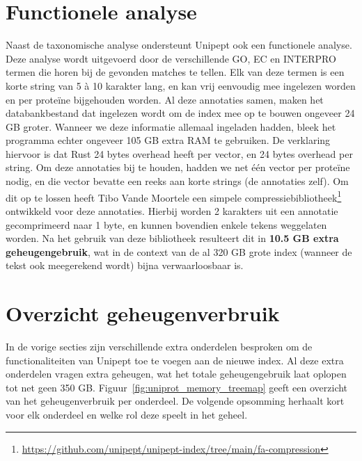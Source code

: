 \section{Functionele analyse}\label{sec:functionele-analyse}
Naast de taxonomische analyse ondersteunt Unipept ook een functionele analyse.
Deze analyse wordt uitgevoerd door de verschillende GO, EC en INTERPRO termen die horen bij de gevonden matches te tellen.
Elk van deze termen is een korte string van 5 à 10 karakter lang, en kan vrij eenvoudig mee ingelezen worden en per proteïne bijgehouden worden.
Al deze annotaties samen, maken het databankbestand dat ingelezen wordt om de index mee op te bouwen ongeveer 24 GB groter.
Wanneer we deze informatie allemaal ingeladen hadden, bleek het programma echter ongeveer 105 GB extra RAM te gebruiken.
De verklaring hiervoor is dat Rust 24 bytes overhead heeft per vector, en 24 bytes overhead per string.
Om deze annotaties bij te houden, hadden we net één vector per proteïne nodig, en die vector bevatte een reeks aan korte strings (de annotaties zelf).
Om dit op te lossen heeft Tibo Vande Moortele een simpele compressiebibliotheek\footnote{\url{https://github.com/unipept/unipept-index/tree/main/fa-compression}} ontwikkeld voor deze annotaties.
Hierbij worden 2 karakters uit een annotatie gecomprimeerd naar 1 byte, en kunnen bovendien enkele tekens weggelaten worden.
Na het gebruik van deze bibliotheek resulteert dit in \textbf{10.5 GB extra geheugengebruik}, wat in de context van de al 320 GB grote index (wanneer de tekst ook meegerekend wordt) bijna verwaarloosbaar is.

\section{Overzicht geheugenverbruik}
In de vorige secties zijn verschillende extra onderdelen besproken om de functionaliteiten van Unipept toe te voegen aan de nieuwe index.
Al deze extra onderdelen vragen extra geheugen, wat het totale geheugengebruik laat oplopen tot net geen 350 GB\@.
Figuur~\ref{fig:uniprot_memory_treemap} geeft een overzicht van het geheugenverbruik per onderdeel.
De volgende opsomming herhaalt kort voor elk onderdeel en welke rol deze speelt in het geheel.

